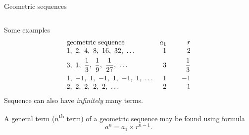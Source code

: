 \documentclass[9pt,aspectratio=169]{beamer}
\begin{document}
\begin{frame}{Geometric sequences}
\begin{columns}[T]
\begin{column}{0.5\textwidth}
      Some examples
      \[
        \begin{array}{l r r}
          \text{geometric sequence}\hspace*{3em} & a_1 & \hspace*{2em}r \\
          1,\ 2,\ 4,\ 8,\ 16,\ 32,\ \ldots & 1 & 2 \\[0.4em]
          3,\ 1,\ \dfrac{1}{3},\ \dfrac{1}{9},\ \dfrac{1}{27},\ \ldots & 3 & \dfrac{1}{3} \\[0.7em]
          1,\ -1,\ 1,\ -1,\ 1,\ -1,\ 1,\ \ldots & 1 & -1 \\
          2,\ 2,\ 2,\ 2,\ 2,\ \ldots & 2 & 1
        \end{array}
      \]
      Sequence can also have \emph{infinitely} many terms.

      \begin{definition}
        A general term ($n$\textsuperscript{th} term) of a geometric sequence may be found using formula
        \[ a^n = a_1 × r^{n-1}. \]
        \vspace*{-1\baselineskip}
      \end{definition}
    \end{column}
  \end{columns}
\end{frame}
\end{document}
